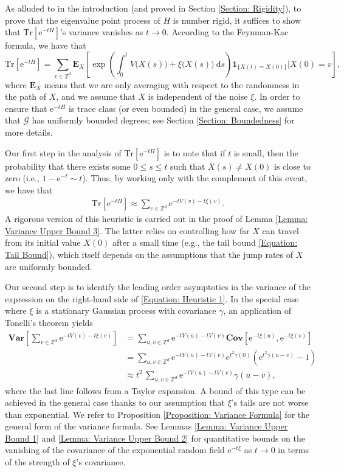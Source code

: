 \documentclass{amsart}
\numberwithin{equation}{section}
\theoremstyle{definition}
\newcommand\ga{\gamma}
\renewcommand\d{~\mathrm d}
\newcommand\mbb{\mathbb}
\newcommand\mbf{\mathbf}
\newcommand\mr{\mathrm}
\newcommand\ms{\mathscr}
\begin{document}
%

As alluded to in the introduction (and proved in Section \ref{Section: Rigidity}),
to prove that the eigenvalue point process of $H$ is number rigid, it suffices to show that
$\mr{Tr}[\mr e^{-t H}]$'s variance vanishes as $t\to0$.
According to the Feynman-Kac formula, we have that
\[\mr{Tr}[\mr e^{-t H}]=\sum_{v\in\mbb Z^d}\mbf E_X\left[\exp\left(\int_0^t V\big(X(s)\big)+\xi\big(X(s)\big)\d s\right)\mbf 1_{\{X(t)=X(0)\}}\bigg|X(0)=v\right],\]
where $\mbf E_X$ means that we are only averaging with respect to the randomness in the path of $X$,
and we assume that $X$ is independent of the noise $\xi$.
In order to ensure that $\mr e^{-t H}$ is trace class (or even bounded) in the general case,
we assume that $\ms G$ has uniformly bounded degrees; see Section \ref{Section: Boundedness}
for more details.


%

Our first step in the analysis of $\mr{Tr}[\mr e^{-t H}]$ is to note that if
$t$ is small, then the probability that there exists some $0\leq s\leq t$ such that $X(s)\neq X(0)$
is close to zero (i.e., $1-\mr e^{-t}\sim t$). Thus, by working only with the complement of this event,
we have that
\begin{align}
\label{Equation: Heuristic 1}
\mr{Tr}[\mr e^{-t H}]\approx\sum_{v\in\mbb Z^d}\mr e^{-tV(v)-t\xi(v)}.
\end{align}
A rigorous version of this heuristic is carried out in
the proof of Lemma \ref{Lemma: Variance Upper Bound 3}.
The latter relies on controlling how far $X$ can travel from its initial value $X(0)$ after a small time
(e.g., the tail  bound \eqref{Equation: Tail Bound}), which itself depends on the
assumptions that the jump rates of $X$ are uniformly bounded.

%

Our second step is to identify the leading order asymptotics in the variance
of the expression on the right-hand side of \eqref{Equation: Heuristic 1}.
In the special case where $\xi$ is a stationary Gaussian process with covariance $\ga$,
an application of Tonelli's theorem yields
\begin{align}
\nonumber
\mbf{Var}\left[\sum_{v\in\mbb Z^d}\mr e^{-tV(v)-t\xi(v)}\right]
&=\sum_{u,v\in\mbb Z^d}\mr e^{-tV(u)-tV(v)}\mbf{Cov}[\mr e^{-t\xi(u)},\mr e^{-t\xi(v)}]\\
\nonumber
&=\sum_{u,v\in\mbb Z^d}\mr e^{-tV(u)-tV(v)}\mr e^{t^2\ga(0)}\left(\mr e^{t^2\ga(u-v)}-1\right)\\
\label{Equation: Heuristic 2}
&\approx t^2\,\sum_{u,v\in\mbb Z^d}\mr e^{-tV(u)-tV(v)}\ga(u-v),
\end{align}
where the last line follows from a Taylor expansion.
A bound of this type can be achieved in the general case thanks to our assumption that
$\xi$'s tails are not worse than exponential. We refer to Proposition \ref{Proposition: Variance Formula}
for the general form of the variance formula. See Lemmas
\ref{Lemma: Variance Upper Bound 1} and \ref{Lemma: Variance Upper Bound 2}
for quantitative bounds on the vanishing of the covariance of the exponential random field $\mr e^{-t\xi}$
as $t\to0$ in terms of the strength of $\xi$'s covariance.
\end{document}
